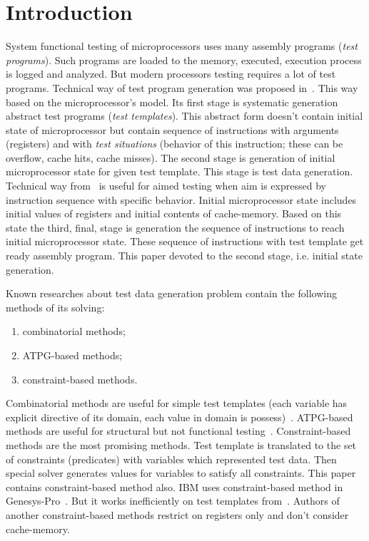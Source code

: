 \section{Introduction}

System functional testing of microprocessors uses many assembly
programs (\emph{test programs}). Such programs are loaded to the
memory, executed, execution process is logged and analyzed. But
modern processors testing requires a lot of test programs. Technical
way of test program generation was proposed
in~\cite{IEEEhowto:kamkin}. This way based on the microprocessor's
model. Its first stage is systematic generation abstract test
programs (\emph{test templates}). This abstract form doesn't contain
initial state of microprocessor but contain sequence of instructions
with arguments (registers) and with \emph{test situations} (behavior
of this instruction; these can be overflow, cache hits, cache
misses). The second stage is generation of initial microprocessor
state for given test template. This stage is test data generation.
Technical way from~\cite{IEEEhowto:kamkin} is useful for aimed
testing when aim is expressed by instruction sequence with specific
behavior. Initial microprocessor state includes initial values of
registers and initial contents of cache-memory. Based on this state
the third, final, stage is generation the sequence of instructions
to reach initial microprocessor state. These sequence of
instructions with test template get ready assembly program. This
paper devoted to the second stage, i.e. initial state generation.

Known researches about test data generation problem contain the
following methods of its solving:
\begin{enumerate}
\item combinatorial methods;
\item ATPG-based methods;
\item constraint-based methods.
\end{enumerate}

Combinatorial methods are useful for simple test templates (each
variable has explicit directive of its domain, each value in domain
is possess)~\cite{IEEEhowto:combinatorial}. ATPG-based methods are
useful for structural but not functional
testing~\cite{IEEEhowto:ATPG}. Constraint-based methods are the most
promising methods. Test template is translated to the set of
constraints (predicates) with variables which represented test data.
Then special solver generates values for variables to satisfy all
constraints. This paper contains constraint-based method also. IBM
uses constraint-based method in
Genesys-Pro~\cite{IEEEhowto:GenesysPro}. But it works inefficiently
on test templates from~\cite{IEEEhowto:kamkin}. Authors of another
constraint-based methods restrict on registers only and don't
consider cache-memory.
